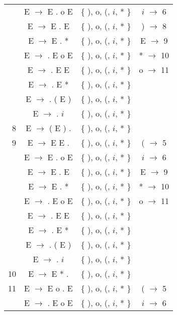 \begin{center}
\begin{longtable}{r|ccc}
      &  E $\rightarrow$ E . o E    & \{ ), o, (, $i$, * \} &  $i$  $\rightarrow$  6   \\
      &  E $\rightarrow$ E . E        & \{ ), o, (, $i$, * \} &  )  $\rightarrow$  8   \\
      &  E $\rightarrow$ E . *      & \{ ), o, (, $i$, * \} &   E   $\rightarrow$  9   \\
      &  E $\rightarrow$ . E o E    & \{ ), o, (, $i$, * \} &  *  $\rightarrow$  10  \\
      &  E $\rightarrow$ . E E        & \{ ), o, (, $i$, * \} &  o  $\rightarrow$  11  \\
      &  E $\rightarrow$ . E *      & \{ ), o, (, $i$, * \} &               \\
      &  E $\rightarrow$ . ( E )  & \{ ), o, (, $i$, * \} &               \\
      &  E $\rightarrow$ . $i$        & \{ ), o, (, $i$, * \} &               \\
\hline
8     &  E $\rightarrow$ ( E ) .  & \{ ), o, (, $i$, * \} &               \\
\hline
9     &  E $\rightarrow$ E E .        & \{ ), o, (, $i$, * \} &  (  $\rightarrow$  5   \\
      &  E $\rightarrow$ E . o E    & \{ ), o, (, $i$, * \} &  $i$  $\rightarrow$  6   \\
      &  E $\rightarrow$ E . E        & \{ ), o, (, $i$, * \} &   E   $\rightarrow$  9   \\
      &  E $\rightarrow$ E . *      & \{ ), o, (, $i$, * \} &  *  $\rightarrow$  10  \\
      &  E $\rightarrow$ . E o E    & \{ ), o, (, $i$, * \} &  o  $\rightarrow$  11  \\
      &  E $\rightarrow$ . E E        & \{ ), o, (, $i$, * \} &               \\
      &  E $\rightarrow$ . E *      & \{ ), o, (, $i$, * \} &               \\
      &  E $\rightarrow$ . ( E )  & \{ ), o, (, $i$, * \} &               \\
      &  E $\rightarrow$ . $i$        & \{ ), o, (, $i$, * \} &               \\
\hline
10    &  E $\rightarrow$ E * .      & \{ ), o, (, $i$, * \} &               \\
\hline
11    &  E $\rightarrow$ E o . E    & \{ ), o, (, $i$, * \} &  (  $\rightarrow$  5   \\
      &  E $\rightarrow$ . E o E    & \{ ), o, (, $i$, * \} &  $i$  $\rightarrow$  6   \\

\end{longtable}
\end{center}
